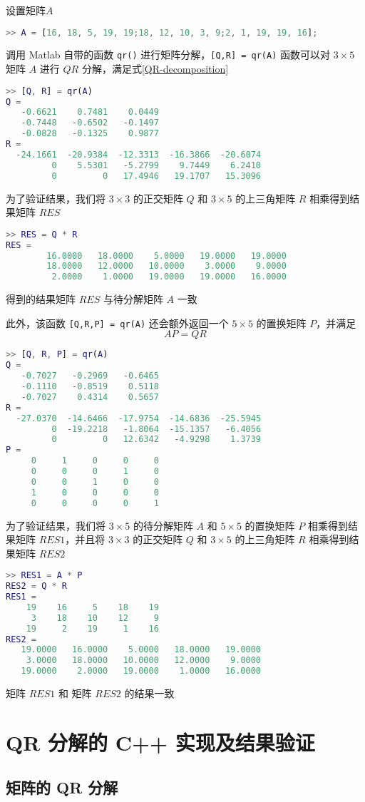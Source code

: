 设置矩阵$A$
\begin{lstlisting}[language=Matlab]  
>> A = [16, 18, 5, 19, 19;18, 12, 10, 3, 9;2, 1, 19, 19, 16];
\end{lstlisting}

调用 Matlab 自带的函数 \lstinline|qr()| 进行矩阵分解，\lstinline|[Q,R] = qr(A)| 函数可以对 $3\times 5$ 矩阵 $A$ 进行 $QR$ 分解，满足式\ref{QR-decomposition}

\begin{lstlisting}[language=Matlab]  
>> [Q, R] = qr(A)
Q =
   -0.6621    0.7481    0.0449
   -0.7448   -0.6502   -0.1497
   -0.0828   -0.1325    0.9877
R =
  -24.1661  -20.9384  -12.3313  -16.3866  -20.6074
         0    5.5301   -5.2799    9.7449    6.2410
         0         0   17.4946   19.1707   15.3096
\end{lstlisting}

为了验证结果，我们将 $3\times 3$ 的正交矩阵 $Q$ 和 $3\times 5$ 的上三角矩阵 $R$ 相乘得到结果矩阵 $RES$
\begin{lstlisting}[language=Matlab]  
>> RES = Q * R
RES =
        16.0000   18.0000    5.0000   19.0000   19.0000
        18.0000   12.0000   10.0000    3.0000    9.0000
         2.0000    1.0000   19.0000   19.0000   16.0000
\end{lstlisting}
得到的结果矩阵 $RES$ 与待分解矩阵 $A$ 一致


此外，该函数 \lstinline|[Q,R,P] = qr(A)| 还会额外返回一个 $5\times 5$ 的置换矩阵 $P$，并满足 
\begin{equation}
    AP = QR
\end{equation}
\begin{lstlisting}[language=Matlab]  
>> [Q, R, P] = qr(A)
Q =
   -0.7027   -0.2969   -0.6465
   -0.1110   -0.8519    0.5118
   -0.7027    0.4314    0.5657
R =
  -27.0370  -14.6466  -17.9754  -14.6836  -25.5945
         0  -19.2218   -1.8064  -15.1357   -6.4056
         0         0   12.6342   -4.9298    1.3739
P =
     0     1     0     0     0
     0     0     0     1     0
     0     0     1     0     0
     1     0     0     0     0
     0     0     0     0     1
\end{lstlisting}

为了验证结果，我们将
$3\times 5$ 的待分解矩阵 $A$ 和 $5\times 5$ 的置换矩阵 $P$ 相乘得到结果矩阵 $RES1$，并且将
$3\times 3$ 的正交矩阵 $Q$ 和 $3\times 5$ 的上三角矩阵 $R$ 相乘得到结果矩阵 $RES2$
\begin{lstlisting}[language=Matlab]  
>> RES1 = A * P
RES2 = Q * R
RES1 =
    19    16     5    18    19
     3    18    10    12     9
    19     2    19     1    16
RES2 =
   19.0000   16.0000    5.0000   18.0000   19.0000
    3.0000   18.0000   10.0000   12.0000    9.0000
   19.0000    2.0000   19.0000    1.0000   16.0000
\end{lstlisting}
矩阵 $RES1$ 和 矩阵 $RES2$ 的结果一致


\section{QR 分解的 C++ 实现及结果验证}
\subsection{矩阵的 QR 分解}